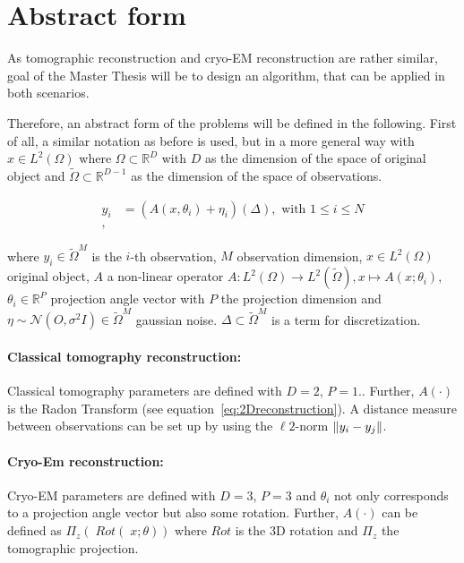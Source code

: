 \section{Abstract form}
As tomographic reconstruction and cryo-EM reconstruction are rather similar, 
goal of the Master Thesis will be to design an algorithm, that can be applied in both scenarios.

Therefore, an abstract form of the problems will be defined in the following.
First of all, a similar notation as before is used, but in a more general way with
$x \in L^2(\Omega)$ where $\Omega \subset \mathbb{R}^D$ with $D$ as the dimension of the space of original object
and $\tilde{\Omega} \subset \mathbb{R}^{D-1}$ as the dimension of the space of observations.


\begin{equation}
    \begin{aligned}
        y_i &= \left( A(x, \theta_i) + \eta_i \right) (\Delta), \text{ with } 1 \leq i \leq N\\,
    \end{aligned}
\end{equation}

where $y_i \in \tilde{\Omega}^M$ is the $i$-th observation, $M$ observation dimension,
$x \in L^2(\Omega)$ original object, $A$ a non-linear operator 
$A: L^2(\Omega) \to L^2(\tilde{\Omega}), x \mapsto A(x; \theta_i)$, 
$\theta_i \in \mathbb{R}^P$ projection angle vector with $P$ the projection dimension
and
$\eta \sim \mathcal{N}(O, \sigma^2 I) \in \tilde{\Omega}^M$ gaussian noise. 
$\Delta \subset \tilde{\Omega}^{M}$ is a term for discretization.

\paragraph{Classical tomography reconstruction:}

Classical tomography parameters are defined with $D=2$, $P=1$..
Further, $A(\cdot)$ is the Radon Transform (see equation~\ref{eq:2Dreconstruction}).
A distance measure between observations can be set up by using the $\ell2$-norm $\left\lVert y_i - y_j\right\rVert$.

\paragraph{Cryo-Em reconstruction:}
Cryo-EM parameters are defined with $D=3$, $P=3$ and $\theta_i$ not only corresponds to
a projection angle vector but also some rotation.
Further, $A(\cdot)$ can be defined as $\Pi_z \left(\; Rot(\;x; \theta) \right)$ 
where $Rot$ is the 3D rotation and $\Pi_z$ the tomographic projection.

